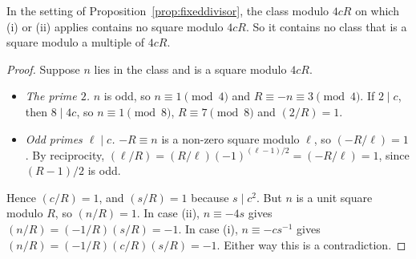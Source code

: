 \begin{proposition}\label{prop:nosquare}
In the setting of Proposition~\ref{prop:fixeddivisor}, the class modulo $4cR$ on which (i) or (ii) applies contains no square modulo $4cR$. So it contains no class that is a square modulo a multiple of $4cR$.
\end{proposition}
\begin{proof}
Suppose $n$ lies in the class and is a square modulo $4cR$.
\begin{itemize}
\item \emph{The prime $2$.} $n$ is odd, so $n\equiv1\pmod4$ and $R\equiv-n\equiv3\pmod4$. If $2\mid c$, then $8\mid4c$, so $n\equiv1\pmod8$, $R\equiv7\pmod8$ and $(2/R)=1$.
\item \emph{Odd primes $\ell\mid c$.} $-R\equiv n$ is a non-zero square modulo $\ell$, so $(-R/\ell)=1$. By reciprocity, $(\ell/R)=(R/\ell)(-1)^{(\ell-1)/2}=(-R/\ell)=1$, since $(R-1)/2$ is odd.
\end{itemize}
Hence $(c/R)=1$, and $(s/R)=1$ because $s\mid c^2$. But $n$ is a unit square modulo $R$, so $(n/R)=1$. In case (ii), $n\equiv-4s$ gives $(n/R)=(-1/R)(s/R)=-1$. In case (i), $n\equiv-cs^{-1}$ gives $(n/R)=(-1/R)(c/R)(s/R)=-1$. Either way this is a contradiction.
\end{proof}

